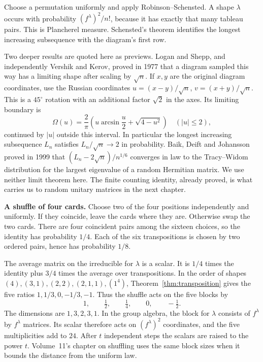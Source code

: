 \begin{beauty}
Choose a permutation uniformly and apply Robinson--Schensted. A shape $\lambda$ occurs with probability $(f^\lambda)^2/n!$, because it has exactly that many tableau pairs. This is Plancherel measure. Schensted's theorem identifies the longest increasing subsequence with the diagram's first row.

Two deeper results are quoted here as previews. Logan and Shepp, and independently Vershik and Kerov, proved in 1977 that a diagram sampled this way has a limiting shape after scaling by $\sqrt n$. If $x,y$ are the original diagram coordinates, use the Russian coordinates $u=(x-y)/\sqrt n$, $v=(x+y)/\sqrt n$. This is a $45^\circ$ rotation with an additional factor $\sqrt2$ in the axes. Its limiting boundary is
\[
\Omega(u)=\frac2\pi\left(u\arcsin\frac u2+\sqrt{4-u^2}\right)
\quad(|u|\le2),
\]
continued by $|u|$ outside this interval. In particular the longest increasing subsequence $L_n$ satisfies $L_n/\sqrt n\to2$ in probability. Baik, Deift and Johansson proved in 1999 that $(L_n-2\sqrt n)/n^{1/6}$ converges in law to the Tracy--Widom distribution for the largest eigenvalue of a random Hermitian matrix. We use neither limit theorem here. The finite counting identity, already proved, is what carries us to random unitary matrices in the next chapter.
\end{beauty}

\textbf{A shuffle of four cards.} Choose two of the four positions independently and uniformly. If they coincide, leave the cards where they are. Otherwise swap the two cards. There are four coincident pairs among the sixteen choices, so the identity has probability $1/4$. Each of the six transpositions is chosen by two ordered pairs, hence has probability $1/8$.

The average matrix on the irreducible for $\lambda$ is a scalar. It is $1/4$ times the identity plus $3/4$ times the average over transpositions. In the order of shapes $(4),(3,1),(2,2),(2,1,1),(1^4)$, Theorem~\ref{thm:transposition} gives the five ratios $1,1/3,0,-1/3,-1$. Thus the shuffle acts on the five blocks by
\[
1,\qquad \tfrac12,\qquad \tfrac14,\qquad 0,\qquad -\tfrac12.
\]
The dimensions are $1,3,2,3,1$. In the group algebra, the block for $\lambda$ consists of $f^\lambda$ by $f^\lambda$ matrices. Its scalar therefore acts on $(f^\lambda)^2$ coordinates, and the five multiplicities add to $24$. After $t$ independent steps the scalars are raised to the power $t$. Volume~11's chapter on shuffling uses the same block sizes when it bounds the distance from the uniform law.

